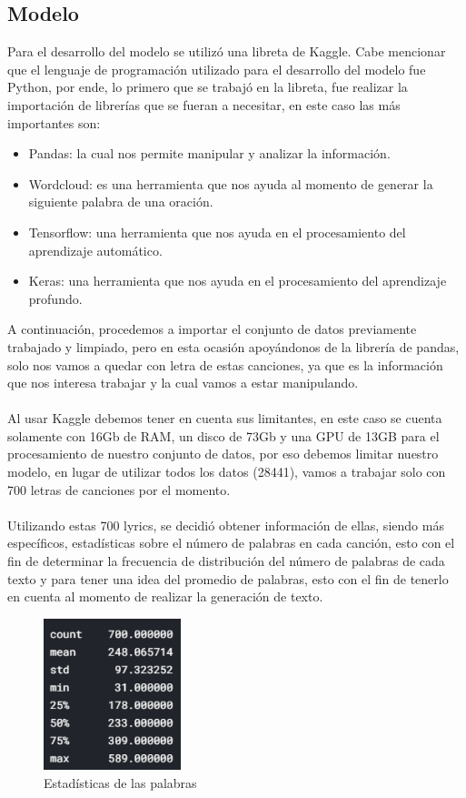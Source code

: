 \subsection{Modelo}
Para el desarrollo del modelo se utilizó una libreta de Kaggle. Cabe mencionar que el lenguaje de programación utilizado para el desarrollo del modelo fue Python, por ende, lo primero que se trabajó en la libreta, fue realizar la importación de librerías que se fueran a necesitar, en este caso las más importantes son:
\begin{itemize}
	\item Pandas: la cual nos permite manipular y analizar la información.
	\item Wordcloud: es una herramienta que nos ayuda al momento de generar la siguiente palabra de una oración.
	\item Tensorflow: una herramienta que nos ayuda en el procesamiento del aprendizaje automático.
	\item Keras: una herramienta que nos ayuda en el procesamiento del aprendizaje profundo.
\end{itemize}
A continuación, procedemos a importar el conjunto de datos previamente trabajado y limpiado, pero en esta ocasión apoyándonos de la librería de pandas, solo nos vamos a quedar con letra de estas canciones, ya que es la información que nos interesa trabajar y la cual vamos a estar manipulando.\\\\
Al usar Kaggle debemos tener en cuenta sus limitantes, en este caso se cuenta solamente con 16Gb de RAM, un disco de 73Gb y una GPU de 13GB para el procesamiento de nuestro conjunto de datos, por eso debemos limitar nuestro modelo, en lugar de utilizar todos los datos (28441), vamos a trabajar solo con 700 letras de canciones por el momento.\\\\ 
Utilizando estas 700 lyrics, se decidió obtener información de ellas, siendo más específicos, estadísticas sobre el número de palabras en cada canción, esto con el fin de determinar la frecuencia de distribución del número de palabras de cada texto y para tener una idea del promedio de palabras, esto con el fin de tenerlo en cuenta al momento de realizar la generación de texto.
\begin{figure}[h]
	\centering
	\includegraphics[width=4cm]{figuras/estadistica.png}
	\caption{Estadísticas de las palabras}
	\label{fig:Estadísticas de las palabras}
\end{figure}
